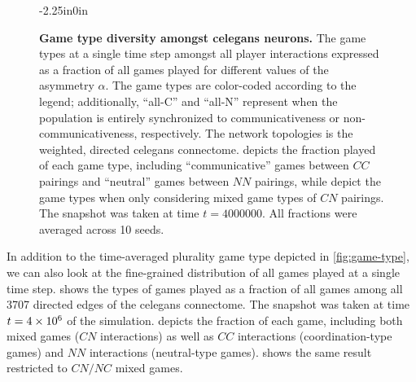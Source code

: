 \documentclass[10pt,letterpaper]{article}
\begin{document}
\begin{figure}
\begin{adjustwidth}{-2.25in}{0in}
  \centering
  \begin{subcaptiongroup}
      {\label{fig:game-snapshot_celegans-full-only-mixed-games}\captiontext*{}}{%
      {\label{fig:game-snapshot_celegans-full}\captiontext*{}}{%
    {}%
  }}
  \end{subcaptiongroup}
  \caption{
    \textbf{
			Game type diversity amongst \gls{celegans} neurons.
    }
    The game types at a single time step
		amongst all player interactions
    expressed as a fraction of all games played
    for different values of the asymmetry $\alpha$.
    The game types are color-coded according to the legend;
    additionally, ``all-C'' and ``all-N'' represent when the population
    is entirely synchronized to communicativeness or non-communicativeness, respectively.
    The network topologies is the
    weighted, directed \gls{celegans} connectome.
		depicts the fraction played of each game type,
		including ``communicative'' games between $CC$ pairings
		and ``neutral'' games between $NN$ pairings,
		while
    depict the game types when only considering mixed game types
		of $CN$ pairings.
		The snapshot was taken at time $t = 4000000$.
		All fractions were averaged across 10 seeds.
  }\label{fig:game-snapshot}
\end{adjustwidth}
\end{figure}

In addition to the time-averaged plurality game type depicted in
\cref{fig:game-type},
we can also look at the fine-grained distribution of
all games played at a single time step.
shows the types of games played as a fraction of all games among all
\num{3707} directed edges of the \gls{celegans} connectome.
The snapshot was taken at time $t=\num{4E6}$ of the simulation.
depicts the fraction of each game,
including both mixed games ($CN$ interactions)
as well as $CC$ interactions (coordination-type games)
and $NN$ interactions (neutral-type games).
shows the same result restricted to $CN/NC$ mixed games.
\end{document}

